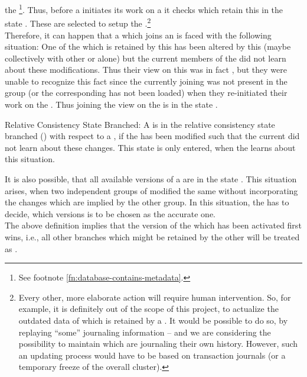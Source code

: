 \documentclass[a4paper, 12pt]{book}
\begin{document}
the \footnote{See
footnote \vref{fn:database-contains-metadata}.}. Thus, before a  initiates its work on a  it checks which
 retain this  in the state
\revrelconstateACCURATE. These  are selected to setup
the .\footnote{Every other, more
elaborate action will require human intervention. So, for example, it
is definitely out of the scope of this project, to actualize the
outdated data of  which is retained by a . It
would be possible to do so, by replaying ``some'' journaling
information -- and we are considering the possibility to maintain
 which are journaling their own history. However, such an
updating process would have to be based on transaction journals (or a
temporary freeze of the overall cluster).}\\
%
Therefore, it can happen that a  which joins an  is faced with the following situation: One of the
 which is retained by this  has been altered
by this  (maybe collectively with other  or
alone) but the current members of the 
did not learn about these modifications. Thus their view on this
 was in fact \revrelconstateOUTDATED, but they were
unable to recognize this fact since the currently joining 
was not present in the group (or the corresponding  has
not been loaded) when they re-initiated their work on the
. Thus joining the  view on the
 is in the state \revrelconstateBRANCHED.
%
\begin{definition*}{Relative Consistency State Branched: \revrelconstateBRANCHED} %
  \label{def:revrelconstateBRANCHED} A  is in the
  relative consistency state branched (\revrelconstateBRANCHED) with
  respect to a , if the  has been
  modified such that the current  did
  not learn about these changes. This state is only entered, when the
   learns about this situation.
\end{definition*}
%
It is also possible, that all available versions of a 
are in the state \revrelconstateBRANCHED. This situation arises, when
two independent groups of  modified the same
 without incorporating the changes which are implied by
the other group. In this situation, the  has to decide,
which versions is to be chosen as the accurate one.\\
%
The above definition implies that the version of the  which has
been activated first wins, i.e., all other branches which might be retained by
the other  will be treated as \revrelconstateBRANCHED.\\
\end{document}
